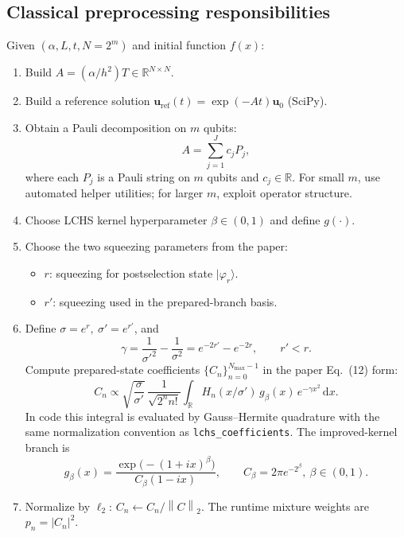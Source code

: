 \documentclass[11pt]{article}
\newcommand{\dd}{\mathrm{d}}
\newcommand{\RR}{\mathbb{R}}
\newcommand{\norm}[1]{\left\lVert #1 \right\rVert}
\begin{document}
\subsection{Classical preprocessing responsibilities}
Given $(\alpha,L,t,N=2^m)$ and initial function $f(x)$:
\begin{enumerate}[itemsep=3pt,topsep=3pt]
\item Build \(A=(\alpha/h^2)T\in\RR^{N\times N}\).
\item Build a reference solution $\mathbf u_{\mathrm{ref}}(t)=\exp(-At)\mathbf u_0$ (SciPy).
\item Obtain a Pauli decomposition on $m$ qubits:
\[
A = \sum_{j=1}^{J} c_j P_j,
\]
where each $P_j$ is a Pauli string on $m$ qubits and $c_j\in\RR$.
For small $m$, use automated helper utilities; for larger $m$, exploit operator structure.
\item Choose LCHS kernel hyperparameter $\beta\in(0,1)$ and define $g(\cdot)$.
\item Choose the two squeezing parameters from the paper:
\begin{itemize}[itemsep=2pt,topsep=2pt]
\item \(r\): squeezing for postselection state \(|\varphi_r\rangle\).
\item \(r'\): squeezing used in the prepared-branch basis.
\end{itemize}
\item Define \(\sigma=e^r,\ \sigma'=e^{r'}\), and
\[
\gamma=\frac{1}{\sigma'^2}-\frac{1}{\sigma^2}=e^{-2r'}-e^{-2r},\qquad r'<r.
\]
Compute prepared-state coefficients \(\{C_n\}_{n=0}^{N_{\max}-1}\) in the paper Eq.~(12) form:
\begin{equation}
C_n
\propto
\sqrt{\frac{\sigma}{\sigma'}}\,
\frac{1}{\sqrt{2^n n!}}
\int_{\RR} H_n(x/\sigma')\,g_\beta(x)\,e^{-\gamma x^2}\,\dd x.
\end{equation}
In code this integral is evaluated by Gauss--Hermite quadrature with the same normalization convention as
\texttt{lchs\_coefficients}. The improved-kernel branch is
\begin{equation}
g_\beta(x)=\frac{\exp\!\big(-(1+ix)^\beta\big)}{C_\beta(1-ix)},
\qquad
C_\beta=2\pi e^{-2^\beta},\ \beta\in(0,1).
\end{equation}
\item Normalize by \(\ell_2\): \(C_n\leftarrow C_n/\norm{C}_2\). The runtime mixture weights are \(p_n=|C_n|^2\).
\end{enumerate}
\end{document}
